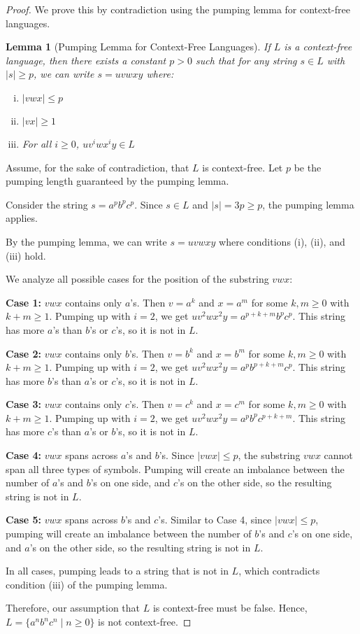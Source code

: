 \documentclass[12pt]{article}
\newtheorem{lemma}{Lemma}
\begin{document}
\begin{proof}
We prove this by contradiction using the pumping lemma for context-free languages.

\begin{lemma}[Pumping Lemma for Context-Free Languages]
If $L$ is a context-free language, then there exists a constant $p > 0$ such that for any string $s \in L$ with $|s| \geq p$, we can write $s = uvwxy$ where:
\begin{enumerate}[(i)]
\item $|vwx| \leq p$
\item $|vx| \geq 1$
\item For all $i \geq 0$, $uv^i wx^i y \in L$
\end{enumerate}
\end{lemma}

Assume, for the sake of contradiction, that $L$ is context-free. Let $p$ be the pumping length guaranteed by the pumping lemma.

Consider the string $s = a^p b^p c^p$. Since $s \in L$ and $|s| = 3p \geq p$, the pumping lemma applies.

By the pumping lemma, we can write $s = uvwxy$ where conditions (i), (ii), and (iii) hold.

We analyze all possible cases for the position of the substring $vwx$:

\textbf{Case 1:} $vwx$ contains only $a$'s.
Then $v = a^k$ and $x = a^m$ for some $k, m \geq 0$ with $k + m \geq 1$.
Pumping up with $i = 2$, we get $uv^2 wx^2 y = a^{p+k+m} b^p c^p$.
This string has more $a$'s than $b$'s or $c$'s, so it is not in $L$.

\textbf{Case 2:} $vwx$ contains only $b$'s.
Then $v = b^k$ and $x = b^m$ for some $k, m \geq 0$ with $k + m \geq 1$.
Pumping up with $i = 2$, we get $uv^2 wx^2 y = a^p b^{p+k+m} c^p$.
This string has more $b$'s than $a$'s or $c$'s, so it is not in $L$.

\textbf{Case 3:} $vwx$ contains only $c$'s.
Then $v = c^k$ and $x = c^m$ for some $k, m \geq 0$ with $k + m \geq 1$.
Pumping up with $i = 2$, we get $uv^2 wx^2 y = a^p b^p c^{p+k+m}$.
This string has more $c$'s than $a$'s or $b$'s, so it is not in $L$.

\textbf{Case 4:} $vwx$ spans across $a$'s and $b$'s.
Since $|vwx| \leq p$, the substring $vwx$ cannot span all three types of symbols.
Pumping will create an imbalance between the number of $a$'s and $b$'s on one side, and $c$'s on the other side, so the resulting string is not in $L$.

\textbf{Case 5:} $vwx$ spans across $b$'s and $c$'s.
Similar to Case 4, since $|vwx| \leq p$, pumping will create an imbalance between the number of $b$'s and $c$'s on one side, and $a$'s on the other side, so the resulting string is not in $L$.

In all cases, pumping leads to a string that is not in $L$, which contradicts condition (iii) of the pumping lemma.

Therefore, our assumption that $L$ is context-free must be false. Hence, $L = \{a^n b^n c^n \mid n \geq 0\}$ is not context-free.
\end{proof}
\end{document}

